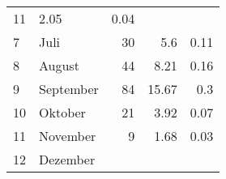 \begin{longtable}{lXrrr}
       \num{11} &
       \num[round-mode=places,round-precision=2]{2.05} &
         \num[round-mode=places,round-precision=2]{0.04} \\

     7 &
     \multicolumn{1}{X}{ Juli   } &


       \num{30} &
       \num[round-mode=places,round-precision=2]{5.6} &
         \num[round-mode=places,round-precision=2]{0.11} \\

     8 &
     \multicolumn{1}{X}{ August   } &


       \num{44} &
       \num[round-mode=places,round-precision=2]{8.21} &
         \num[round-mode=places,round-precision=2]{0.16} \\

     9 &
     \multicolumn{1}{X}{ September   } &


       \num{84} &
       \num[round-mode=places,round-precision=2]{15.67} &
         \num[round-mode=places,round-precision=2]{0.3} \\

     10 &
     \multicolumn{1}{X}{ Oktober   } &


       \num{21} &
       \num[round-mode=places,round-precision=2]{3.92} &
         \num[round-mode=places,round-precision=2]{0.07} \\

     11 &
     \multicolumn{1}{X}{ November   } &


       \num{9} &
       \num[round-mode=places,round-precision=2]{1.68} &
         \num[round-mode=places,round-precision=2]{0.03} \\

     12 &
     \multicolumn{1}{X}{ Dezember   } &



\end{longtable}
